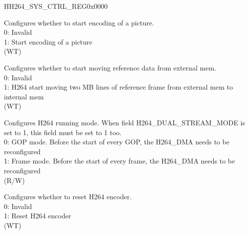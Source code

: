 \begin{register}{H}{H264\_SYS\_CTRL\_REG}{0x0000}\label{regdesc:H264SYSCTRLREG}
%
%
%
%
%
\regnewline%
\begin{regdesc}\begin{reglist}
\label{fielddesc:H264FRAMESTART}\item [H264\_FRAME\_START] Configures whether to start encoding of a picture.\\0: Invalid \\1: Start encoding of a picture \\(WT)
\label{fielddesc:H264DMAMOVESTART}\item [H264\_DMA\_MOVE\_START] Configures whether to start moving reference data from external mem.\\0: Invalid \\1: H264 start moving two MB lines of reference frame from external mem to internal mem \\(WT)
\label{fielddesc:H264FRAMEMODE}\item [H264\_FRAME\_MODE] Configures H264 running mode. When field H264\_DUAL\_STREAM\_MODE is set to 1, this field must be set to 1 too.\\0: GOP mode. Before the start of every GOP, the H264\_DMA needs to be reconfigured \\1: Frame mode. Before the start of every frame, the H264\_DMA needs to be reconfigured \\(R/W)
\label{fielddesc:H264SYSRSTPULSE}\item [H264\_SYS\_RST\_PULSE] Configures whether to reset H264 encoder.\\0: Invalid \\1: Reset H264 encoder \\(WT)
\end{reglist}\end{regdesc}
\end{register}



